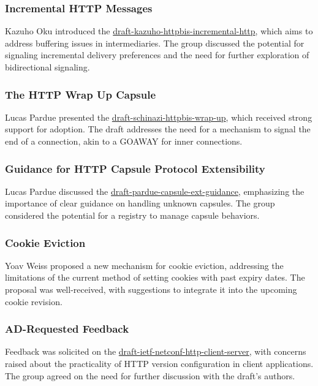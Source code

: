\documentclass{article}
\begin{document}
\subsubsection{Incremental HTTP Messages}
Kazuho Oku introduced the \href{https://datatracker.ietf.org/doc/html/draft-kazuho-httpbis-incremental-http}{draft-kazuho-httpbis-incremental-http}, which aims to address buffering issues in intermediaries. The group discussed the potential for signaling incremental delivery preferences and the need for further exploration of bidirectional signaling.

\subsubsection{The HTTP Wrap Up Capsule}
Lucas Pardue presented the \href{https://datatracker.ietf.org/doc/html/draft-schinazi-httpbis-wrap-up}{draft-schinazi-httpbis-wrap-up}, which received strong support for adoption. The draft addresses the need for a mechanism to signal the end of a connection, akin to a GOAWAY for inner connections.

\subsubsection{Guidance for HTTP Capsule Protocol Extensibility}
Lucas Pardue discussed the \href{https://datatracker.ietf.org/doc/html/draft-pardue-capsule-ext-guidance}{draft-pardue-capsule-ext-guidance}, emphasizing the importance of clear guidance on handling unknown capsules. The group considered the potential for a registry to manage capsule behaviors.

\subsubsection{Cookie Eviction}
Yoav Weiss proposed a new mechanism for cookie eviction, addressing the limitations of the current method of setting cookies with past expiry dates. The proposal was well-received, with suggestions to integrate it into the upcoming cookie revision.

\subsubsection{AD-Requested Feedback}
Feedback was solicited on the \href{https://datatracker.ietf.org/doc/draft-ietf-netconf-http-client-server/}{draft-ietf-netconf-http-client-server}, with concerns raised about the practicality of HTTP version configuration in client applications. The group agreed on the need for further discussion with the draft's authors.
\end{document}
